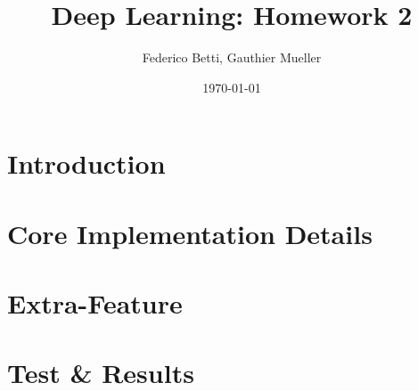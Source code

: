 \documentclass{article}
\title{Deep Learning: Homework 2}
\date{\today}
\author{Federico Betti, Gauthier Mueller}
\begin{document}
\maketitle
\tableofcontents
\thispagestyle{empty}
\clearpage

\setcounter{page}{1}
\section{Introduction}
\label{sect:Introduction}


\section{Core Implementation Details}
\label{sect:CoreImplementationDetails}


\section{Extra-Feature}
\label{sect:ExtraFeature}


\section{Test \& Results}
\label{sect:Results}

\end{document}
